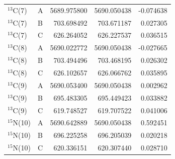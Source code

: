 \begin{longtable}{llrrr}
$^{13}$C(7) & A & 5689.975800 & 5690.050438 & -0.074638 \\
$^{13}$C(7) & B & 703.698492 & 703.671187 & 0.027305 \\
$^{13}$C(7) & C & 626.264052 & 626.227537 & 0.036515 \\
$^{13}$C(8) & A & 5690.022772 & 5690.050438 & -0.027665 \\
$^{13}$C(8) & B & 703.494496 & 703.468195 & 0.026302 \\
$^{13}$C(8) & C & 626.102657 & 626.066762 & 0.035895 \\
$^{13}$C(9) & A & 5690.053400 & 5690.050438 & 0.002962 \\
$^{13}$C(9) & B & 695.483305 & 695.449423 & 0.033882 \\
$^{13}$C(9) & C & 619.748527 & 619.707522 & 0.041006 \\
$^{15}$N(10) & A & 5690.642889 & 5690.050438 & 0.592451 \\
$^{15}$N(10) & B & 696.225258 & 696.205039 & 0.020218 \\
$^{15}$N(10) & C & 620.336151 & 620.307440 & 0.028710 \\
\bottomrule
\end{longtable}
\normalsize
